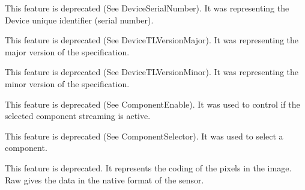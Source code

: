 \begin{DoxyRefList}
\item[\label{deprecated__deprecated000099}%
\hypertarget{deprecated__deprecated000099}{}%
成员 \hyperlink{classmv_i_m_p_a_c_t_1_1acquire_1_1_gen_i_cam_1_1_device_module_a656ceaaf54b8598e6bc71484c4d5734b}{mv\+I\+M\+P\+A\+C\+T\+:\+:acquire\+:\+:Gen\+I\+Cam\+:\+:Device\+Module\+:\+:device\+I\+D} ]This feature is deprecated (See Device\+Serial\+Number). It was representing the Device unique identifier (serial number).  
\item[\label{deprecated__deprecated000100}%
\hypertarget{deprecated__deprecated000100}{}%
成员 \hyperlink{classmv_i_m_p_a_c_t_1_1acquire_1_1_gen_i_cam_1_1_device_module_a6c6ae00a97052ba073dc23b69b02936c}{mv\+I\+M\+P\+A\+C\+T\+:\+:acquire\+:\+:Gen\+I\+Cam\+:\+:Device\+Module\+:\+:gev\+Version\+Major} ]This feature is deprecated (See Device\+T\+L\+Version\+Major). It was representing the major version of the specification.  
\item[\label{deprecated__deprecated000101}%
\hypertarget{deprecated__deprecated000101}{}%
成员 \hyperlink{classmv_i_m_p_a_c_t_1_1acquire_1_1_gen_i_cam_1_1_device_module_afaf53a88b30e32fc35ed8f68ddbd3b46}{mv\+I\+M\+P\+A\+C\+T\+:\+:acquire\+:\+:Gen\+I\+Cam\+:\+:Device\+Module\+:\+:gev\+Version\+Minor} ]This feature is deprecated (See Device\+T\+L\+Version\+Minor). It was representing the minor version of the specification.  
\item[\label{deprecated__deprecated000040}%
\hypertarget{deprecated__deprecated000040}{}%
成员 \hyperlink{classmv_i_m_p_a_c_t_1_1acquire_1_1_gen_i_cam_1_1_image_format_control_abb89d1bfa99e26551bb92e842195d2f8}{mv\+I\+M\+P\+A\+C\+T\+:\+:acquire\+:\+:Gen\+I\+Cam\+:\+:Image\+Format\+Control\+:\+:image\+Component\+Enable} ]This feature is deprecated (See Component\+Enable). It was used to control if the selected component streaming is active.  
\item[\label{deprecated__deprecated000039}%
\hypertarget{deprecated__deprecated000039}{}%
成员 \hyperlink{classmv_i_m_p_a_c_t_1_1acquire_1_1_gen_i_cam_1_1_image_format_control_a9ca6d7404e0a91dffc11e1ac777f2d23}{mv\+I\+M\+P\+A\+C\+T\+:\+:acquire\+:\+:Gen\+I\+Cam\+:\+:Image\+Format\+Control\+:\+:image\+Component\+Selector} ]This feature is deprecated (See Component\+Selector). It was used to select a component. 
\item[\label{deprecated__deprecated000041}%
\hypertarget{deprecated__deprecated000041}{}%
成员 \hyperlink{classmv_i_m_p_a_c_t_1_1acquire_1_1_gen_i_cam_1_1_image_format_control_a9eac6c5f816b0325c6d82d6007b44c33}{mv\+I\+M\+P\+A\+C\+T\+:\+:acquire\+:\+:Gen\+I\+Cam\+:\+:Image\+Format\+Control\+:\+:pixel\+Coding} ]This feature is deprecated. It represents the coding of the pixels in the image. Raw gives the data in the native format of the sensor. 

\end{DoxyRefList}
